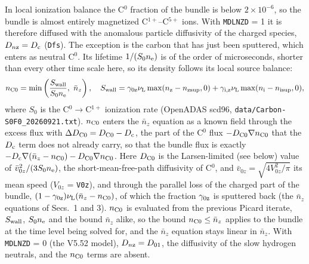 \documentclass[11pt]{article}
\def\r#1{{\rm#1}}
\def\nee{n_\r{e}}
\def\ni{n_\r{i}}
\def\nz{n_\r{z}}
\def\nsup#1{n_\r{#1sup}}
\def\nnz{\bar{n}_{z}}
\def\nuL{\nu_\r{L}}
\begin{document}
In local ionization balance the C$^0$ fraction of the bundle is below
$2\times10^{-6}$, so the bundle is almost entirely magnetized C$^{1+}$--C$^{5+}$
ions.  With \texttt{MDLNZD} = 1 it is therefore diffused with the anomalous
particle diffusivity of the charged species, $D_{n\r{z}} = D_\r{c}$ (\texttt{Dfs}).
The exception is the carbon that has just been sputtered, which enters as
neutral C$^0$.  Its lifetime $1/(S_0\nee)$ is of the order of microseconds,
shorter than every other time scale here, so its density follows its local
source balance:
\begin{equation}
  n_\r{C0} = \min\left(\frac{S_\r{wall}}{S_0\nee},\ \nnz\right),\quad
  S_\r{wall} = \gamma_\r{0z}\nuL \max(\nz-\nsup{z},0) + \gamma_\r{i,z}\nuL\max(\ni-\nsup{i},0),
\end{equation}
where $S_0$ is the C$^0\to$C$^{1+}$ ionization rate (OpenADAS scd96,
\texttt{data/Carbon-S0F0\_20260921.txt}).  $n_\r{C0}$ enters the $\nnz$
equation as a known field through the excess flux with
$\Delta D_\r{C0} = D_\r{C0} - D_\r{c}$, the part of the C$^0$ flux
$-D_\r{C0}\nabla n_\r{C0}$ that the $D_\r{c}$ term does not already carry, so that the
bundle flux is exactly $-D_\r{c}\nabla(\nnz-n_\r{C0}) - D_\r{C0}\nabla n_\r{C0}$.
Here $D_\r{C0}$ is the Larsen-limited (see below) value of $\bar v_{0z}^2/(3S_0\nee)$,
the short-mean-free-path diffusivity of C$^0$, and $\bar v_{0z} = \sqrt{4V_{0z}^2/\pi}$
its mean speed ($V_{0z}$ = \texttt{V0z}), and through the parallel loss of the
charged part of the bundle, $(1-\gamma_\r{0z})\nuL(\nnz-n_\r{C0})$, of which the
fraction $\gamma_\r{0z}$ is sputtered back (the $\nnz$ equations of Secs.~1 and 3).
$n_\r{C0}$ is evaluated from the previous Picard iterate, $S_\r{wall}$, $S_0\nee$ and the
bound $\nnz$ alike, so the bound $n_\r{C0}\le\nnz$ applies to the bundle at the time level
being solved for, and the $\nnz$ equation stays linear in $\nnz$.  With \texttt{MDLNZD} = 0 (the V5.52 model),
$D_{n\r{z}} = D_{01}$, the diffusivity of the slow hydrogen neutrals, and the
$n_\r{C0}$ terms are absent.
\end{document}
